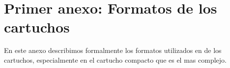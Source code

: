 \documentclass[../main.tex]{subfiles}
\begin{document}
\chapter{Primer anexo: Formatos de los cartuchos}

En este anexo describimos formalmente los formatos utilizados en de los cartuchos, especialmente en el cartucho compacto que es el mas complejo.
\end{document}
